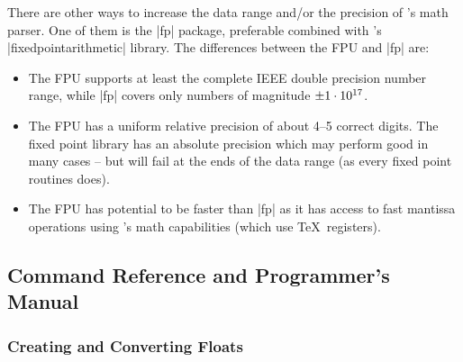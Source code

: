 There are other ways to increase the data range and/or the precision of
\pgfname's math parser. One of them is the |fp| package, preferable combined
with \pgfname's |fixedpointarithmetic| library. The differences between the FPU
and |fp| are:
%
\begin{itemize}
    \item The FPU supports at least the complete IEEE double precision number
        range, while |fp| covers only numbers of magnitude
        $\pm\pgfmathprintnumber{1e17}$.
    \item The FPU has a uniform relative precision of about 4--5 correct
        digits. The fixed point library has an absolute precision which may
        perform good in many cases -- but will fail at the ends of the data
        range (as every fixed point routines does).
    \item The FPU has potential to be faster than |fp| as it has access to fast
        mantissa operations using \pgfname's math capabilities (which use \TeX\
        registers).
\end{itemize}


\subsection{Command Reference and Programmer's Manual}

\subsubsection{Creating and Converting Floats}

